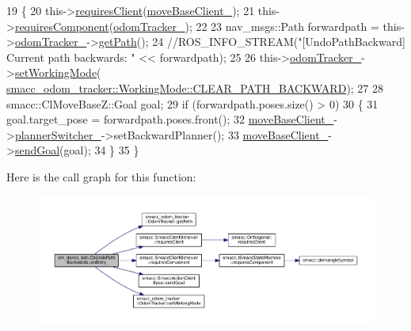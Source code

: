 \begin{DoxyCode}
19   \{
20     this->\hyperlink{classsmacc_1_1SmaccClientBehavior_adc21bbd45d36bd81ca6f778ed161807a}{requiresClient}(\hyperlink{classsm__dance__bot_1_1CbUndoPathBackwards_af79da57bfb5ecd6b20af32e44d4b9ca9}{moveBaseClient\_});
21     this->\hyperlink{classsmacc_1_1SmaccClientBehavior_a011246bb1424f8bf8c9322f652db9d88}{requiresComponent}(\hyperlink{classsm__dance__bot_1_1CbUndoPathBackwards_a51cc8ec7a7e9da1f3cb4c1816b382af9}{odomTracker\_});
22 
23     nav\_msgs::Path forwardpath = this->\hyperlink{classsm__dance__bot_1_1CbUndoPathBackwards_a51cc8ec7a7e9da1f3cb4c1816b382af9}{odomTracker\_}->\hyperlink{classsmacc__odom__tracker_1_1OdomTracker_ace0762f93bc272a426d3038f74dc8752}{getPath}();
24     \textcolor{comment}{//ROS\_INFO\_STREAM("[UndoPathBackward] Current path backwards: " << forwardpath);}
25 
26     this->\hyperlink{classsm__dance__bot_1_1CbUndoPathBackwards_a51cc8ec7a7e9da1f3cb4c1816b382af9}{odomTracker\_}->\hyperlink{classsmacc__odom__tracker_1_1OdomTracker_a38fbca999297c46dc95628cc60851a45}{setWorkingMode}(
      \hyperlink{namespacesmacc__odom__tracker_ade9730dd5cc10ccfad9362176cf46c33a0cf8f27617189e35619df3c18bda6274}{smacc\_odom\_tracker::WorkingMode::CLEAR\_PATH\_BACKWARD});
27 
28     smacc::ClMoveBaseZ::Goal goal;
29     \textcolor{keywordflow}{if} (forwardpath.poses.size() > 0)
30     \{
31       goal.target\_pose = forwardpath.poses.front();
32       \hyperlink{classsm__dance__bot_1_1CbUndoPathBackwards_af79da57bfb5ecd6b20af32e44d4b9ca9}{moveBaseClient\_}->\hyperlink{classsmacc_1_1ClMoveBaseZ_a1a20609e1b4a9406cd6cece0d74acfe5}{plannerSwitcher\_}->setBackwardPlanner();
33       \hyperlink{classsm__dance__bot_1_1CbUndoPathBackwards_af79da57bfb5ecd6b20af32e44d4b9ca9}{moveBaseClient\_}->\hyperlink{classsmacc_1_1SmaccActionClientBase_a58c67a87c5fb8ea1633573c58fe3eee1}{sendGoal}(goal);
34     \}
35   \}
\end{DoxyCode}


Here is the call graph for this function\+:
\nopagebreak
\begin{figure}[H]
\begin{center}
\leavevmode
\includegraphics[width=350pt]{classsm__dance__bot_1_1CbUndoPathBackwards_a5ecdf83df96ab3d74eb4e4febea7fa74_cgraph}
\end{center}
\end{figure}




